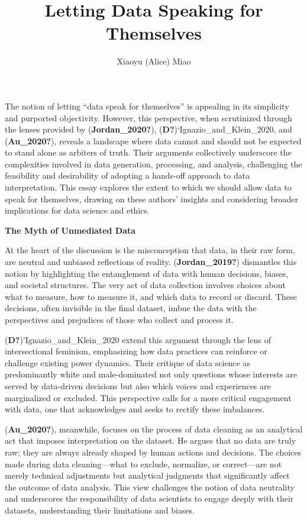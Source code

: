 \documentclass[
  letterpaper,
  DIV=11,
  numbers=noendperiod]{scrartcl}
\title{Letting Data Speaking for Themselves}
\author{Xiaoyu (Alice) Miao}
\date{}
\begin{document}
\maketitle

The notion of letting ``data speak for themselves'' is appealing in its
simplicity and purported objectivity. However, this perspective, when
scrutinized through the lenses provided by (\textbf{Jordan\_2020?}),
(\textbf{D?})`Ignazio\_and\_Klein\_2020, and (\textbf{Au\_2020?}),
reveals a landscape where data cannot and should not be expected to
stand alone as arbiters of truth. Their arguments collectively
underscore the complexities involved in data generation, processing, and
analysis, challenging the feasibility and desirability of adopting a
hands-off approach to data interpretation. This essay explores the
extent to which we should allow data to speak for themselves, drawing on
these authors' insights and considering broader implications for data
science and ethics.

\textbf{The Myth of Unmediated Data}

At the heart of the discussion is the misconception that data, in their
raw form, are neutral and unbiased reflections of reality.
(\textbf{Jordan\_2019?}) dismantles this notion by highlighting the
entanglement of data with human decisions, biases, and societal
structures. The very act of data collection involves choices about what
to measure, how to measure it, and which data to record or discard.
These decisions, often invisible in the final dataset, imbue the data
with the perspectives and prejudices of those who collect and process
it.

(\textbf{D?})'Ignazio\_and\_Klein\_2020 extend this argument through the
lens of intersectional feminism, emphasizing how data practices can
reinforce or challenge existing power dynamics. Their critique of data
science as predominantly white and male-dominated not only questions
whose interests are served by data-driven decisions but also which
voices and experiences are marginalized or excluded. This perspective
calls for a more critical engagement with data, one that acknowledges
and seeks to rectify these imbalances.

(\textbf{Au\_2020?}), meanwhile, focuses on the process of data cleaning
as an analytical act that imposes interpretation on the dataset. He
argues that no data are truly raw; they are always already shaped by
human actions and decisions. The choices made during data
cleaning---what to exclude, normalize, or correct---are not merely
technical adjustments but analytical judgments that significantly affect
the outcome of data analysis. This view challenges the notion of data
neutrality and underscores the responsibility of data scientists to
engage deeply with their datasets, understanding their limitations and
biases.
\end{document}
